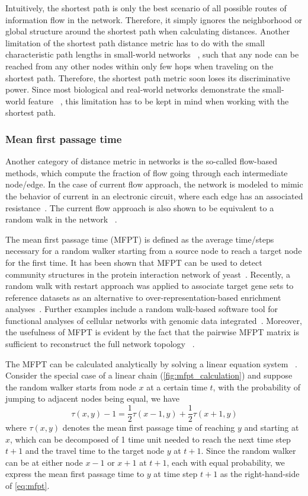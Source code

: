 Intuitively, the shortest path is only the best scenario of all possible routes
of information flow in the network. Therefore, it simply ignores the 
neighborhood or global structure around the shortest path when calculating
distances. Another limitation of the shortest path distance metric has to do
with the small characteristic path lengths in small-world networks~%
\citep{Watts1998}, such that any node can be reached from any other nodes
within only few hops when traveling on the shortest path.
Therefore, the shortest path
metric soon loses its discriminative power. Since most biological
and real-world networks demonstrate the small-world feature~%
\citep{Barabasi2004}, this limitation
has to be kept in mind when working with the shortest path.

\subsubsection{Mean first passage time}
Another category of distance metric in networks is the 
so-called flow-based methods, which compute the fraction of flow going through each intermediate node/edge. In the case of current flow approach, the network is modeled to mimic the behavior of current in an electronic circuit, where each edge has an associated resistance~\citep{Missiuro2009}. The current flow approach is
also shown to be equivalent to a random walk in the network~%
\citep{Doyle2000}.

The mean first passage time (MFPT) is defined as the average time/steps 
necessary for 
a random walker starting from a source node to reach a target node for the
first time. It has been shown that MFPT can be used to detect community
structures in the protein interaction network of yeast~\citep{Zhou2003}. 
Recently, a random walk with restart approach was applied to associate
target gene sets to reference datasets as an alternative to 
over-representation-based enrichment analyses~\citep{Glaab2012}. 
Further examples include a random walk-based software tool for functional
analyses of cellular networks with genomic data integrated~\citep{Komurov2012a}.
Moreover,
the usefulness of MFPT is evident by the fact that the pairwise MFPT 
matrix is sufficient to reconstruct the full network topology~%
\citep{Wittmann2009}.

The MFPT can be calculated analytically by solving a linear equation system~%
\citep{Kampen2007,Weber2010}. Consider the special case of a linear chain 
(\ref{fig:mfpt_calculation}) and suppose the random walker starts from node 
$x$ at a certain time $t$, with the probability of jumping to adjacent nodes
being equal, we have
\begin{equation}
\tau(x,y) - 1 = \frac{1}{2}\tau(x-1,y) + \frac{1}{2}\tau(x+1,y)
\label{eq:mfpt}
\end{equation}
where $\tau(x,y)$ denotes the mean first passage time of reaching $y$ and 
starting at $x$, which can be decomposed of 1 time unit needed to reach the
next time step $t+1$ and the travel time to the target node $y$ at $t+1$.
Since the random walker can be at either node $x-1$ or $x+1$ at $t+1$, each
with equal probability, we express the mean first passage time to $y$ at
time step $t+1$ as the right-hand-side of \ref{eq:mfpt}.

